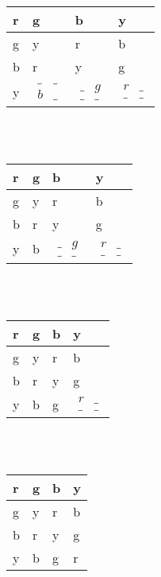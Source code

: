 \documentclass[a4paper]{article}
\begin{document}
\begin{tabular}{|l|l|l|l|}
\hline
r & g & b & y \\ \hline
g & y & r & b \\ \hline
b & r & y & g \\ \hline
y & $\begin{matrix}   \_ & \_ \\   b & \_  \end{matrix}$ & $\begin{matrix}   \_ & g \\   \_ & \_  \end{matrix}$ & $\begin{matrix}   r & \_ \\   \_ & \_  \end{matrix}$ \\ \hline
\end{tabular}\\\\
\begin{tabular}{|l|l|l|l|}
\hline
r & g & b & y \\ \hline
g & y & r & b \\ \hline
b & r & y & g \\ \hline
y & b & $\begin{matrix}   \_ & g \\   \_ & \_  \end{matrix}$ & $\begin{matrix}   r & \_ \\   \_ & \_  \end{matrix}$ \\ \hline
\end{tabular}\\\\
\begin{tabular}{|l|l|l|l|}
\hline
r & g & b & y \\ \hline
g & y & r & b \\ \hline
b & r & y & g \\ \hline
y & b & g & $\begin{matrix}   r & \_ \\   \_ & \_  \end{matrix}$ \\ \hline
\end{tabular}\\\\
\begin{tabular}{|l|l|l|l|}
\hline
r & g & b & y \\ \hline
g & y & r & b \\ \hline
b & r & y & g \\ \hline
y & b & g & r \\ \hline
\end{tabular}\\\\
\end{document}
